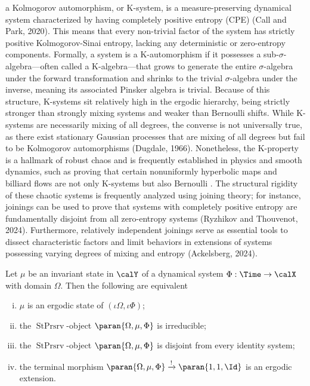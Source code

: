 \documentclass[12pt,oneside,pb-diagram]{article}
\DeclareMathOperator{\sps}{StPrsrv}
\begin{document}
\begin{Erg}{}{} 
	a Kolmogorov automorphism, or K-system, is a measure-preserving dynamical system characterized by having completely positive entropy (CPE) (Call and Park, 2020). This means that every non-trivial factor of the system has strictly positive Kolmogorov-Sinai entropy, lacking any deterministic or zero-entropy components. Formally, a system is a K-automorphism if it possesses a sub-$\sigma$-algebra—often called a K-algebra—that grows to generate the entire $\sigma$-algebra under the forward transformation and shrinks to the trivial $\sigma$-algebra under the inverse, meaning its associated Pinsker algebra is trivial. Because of this structure, K-systems sit relatively high in the ergodic hierarchy, being strictly stronger than strongly mixing systems and weaker than Bernoulli shifts. While K-systems are necessarily mixing of all degrees, the converse is not universally true, as there exist stationary Gaussian processes that are mixing of all degrees but fail to be Kolmogorov automorphisms (Dugdale, 1966). Nonetheless, the K-property is a hallmark of robust chaos and is frequently established in physics and smooth dynamics, such as proving that certain nonuniformly hyperbolic maps and billiard flows are not only K-systems but also Bernoulli \cite{ChernovHaskell1996}. The structural rigidity of these chaotic systems is frequently analyzed using joining theory; for instance, joinings can be used to prove that systems with completely positive entropy are fundamentally disjoint from all zero-entropy systems (Ryzhikov and Thouvenot, 2024). Furthermore, relatively independent joinings serve as essential tools to dissect characteristic factors and limit behaviors in extensions of systems possessing varying degrees of mixing and entropy (Ackelsberg, 2024).
	\cite{Thouvenot1995join}
\end{Erg}

\begin{theorem}  \label{thm:9dj8zl}
	Let $\mu$ be an invariant state in $\calY$ of a dynamical system $\Phi : \Time \to \calX$ with domain $\Omega$. Then the following are equivalent
	\begin{enumerate} [(i)]
		\item $\mu$ is an ergodic state of $(\iota\Omega, \iota\Phi)$;
		\item the $\sps$-object $\paran{\Omega, \mu, \Phi}$ is irreducible;
		\item the $\sps$-object $\paran{\Omega, \mu, \Phi}$ is disjoint from every identity system;
		\item the terminal morphism $\paran{\Omega, \mu, \Phi} \xrightarrow{!} \paran{1, 1, \Id}$ is an ergodic extension.
	\end{enumerate}
\end{theorem}
\end{document}
